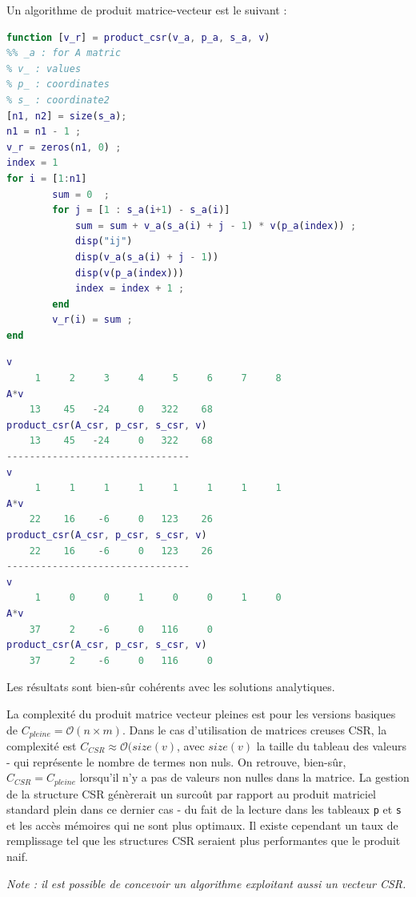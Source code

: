 \documentclass[12pt]{report}
\begin{document}
Un algorithme de produit matrice-vecteur est le suivant : 

\begin{lstlisting}[language=Matlab, caption=Algorithme de produit matrice CSR - vecteur]
function [v_r] = product_csr(v_a, p_a, s_a, v)
%% _a : for A matric
% v_ : values
% p_ : coordinates
% s_ : coordinate2    
[n1, n2] = size(s_a);
n1 = n1 - 1 ; 
v_r = zeros(n1, 0) ; 
index = 1
for i = [1:n1]
        sum = 0  ; 
        for j = [1 : s_a(i+1) - s_a(i)]
            sum = sum + v_a(s_a(i) + j - 1) * v(p_a(index)) ; 
            disp("ij")
            disp(v_a(s_a(i) + j - 1))
            disp(v(p_a(index)))
            index = index + 1 ; 
        end
        v_r(i) = sum ; 
end
\end{lstlisting}

\begin{lstlisting}[language=Matlab, caption=Résultats produit]
v
     1     2     3     4     5     6     7     8
A*v
    13    45   -24     0   322    68
product_csr(A_csr, p_csr, s_csr, v)
    13    45   -24     0   322    68
--------------------------------
v
     1     1     1     1     1     1     1     1
A*v
    22    16    -6     0   123    26
product_csr(A_csr, p_csr, s_csr, v)
    22    16    -6     0   123    26
--------------------------------
v
     1     0     0     1     0     0     1     0
A*v
    37     2    -6     0   116     0
product_csr(A_csr, p_csr, s_csr, v)
    37     2    -6     0   116     0
\end{lstlisting}

Les résultats sont bien-sûr cohérents avec les solutions analytiques.

La complexité du produit matrice vecteur pleines est pour les versions basiques de $C_{pleine} = \mathcal{O}(n\times m)$. Dans le cas d'utilisation de matrices creuses CSR, la complexité est $C_{CSR} \approx \mathcal{O}(size(v)$, avec $size(v)$ la taille du tableau des valeurs - qui représente le nombre de termes non nuls. On retrouve, bien-sûr,  $C_{CSR} = C_{pleine}$ lorsqu'il n'y a pas de valeurs non nulles dans la matrice. La gestion de la structure CSR génèrerait un surcoût par rapport au produit matriciel standard plein dans ce dernier cas - du fait de la lecture dans les tableaux \texttt{p} et \texttt{s} et les accès mémoires qui ne sont plus optimaux. Il existe cependant un taux de remplissage tel que les structures CSR seraient plus performantes que le produit naif.

\textit{Note : il est possible de concevoir un algorithme exploitant aussi un vecteur CSR.}
\end{document}

